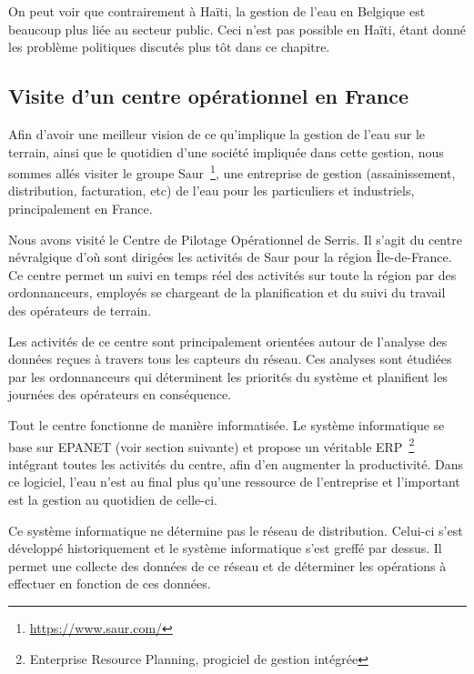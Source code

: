 \documentclass{EPL-master-thesis-covers-FR}
\begin{document}

				On peut voir que contrairement à Haïti, la gestion de l'eau en Belgique est beaucoup plus liée au secteur public. Ceci n'est pas possible en Haïti, étant donné les problème politiques discutés plus tôt dans ce chapitre.

			\subsection*{Visite d'un centre opérationnel en France}

				Afin d'avoir une meilleur vision de ce qu'implique la gestion de l'eau sur le terrain, ainsi que le quotidien d'une société impliquée dans cette gestion, nous sommes allés visiter le groupe Saur~\footnote{\url{https://www.saur.com/}}, une entreprise de gestion (assainissement, distribution, facturation, etc) de l'eau pour les particuliers et industriels, principalement en France.

				Nous avons visité le Centre de Pilotage Opérationnel de Serris. Il s'agit du centre névralgique d'où sont dirigées les activités de Saur pour la région Île-de-France. Ce centre permet un suivi en temps réel des activités sur toute la région par des ordonnanceurs, employés se chargeant de la planification et du suivi du travail des opérateurs de terrain.

				Les activités de ce centre sont principalement orientées autour de l'analyse des données reçues à travers tous les capteurs du réseau. Ces analyses sont étudiées par les ordonnanceurs qui déterminent les priorités du système et planifient les journées des opérateurs en conséquence.

				Tout le centre fonctionne de manière informatisée. Le système informatique se base sur EPANET (voir section suivante) et propose un véritable ERP~\footnote{Enterprise Resource Planning, progiciel de gestion intégrée} intégrant toutes les activités du centre, afin d'en augmenter la productivité. Dans ce logiciel, l'eau n'est au final plus qu'une ressource de l'entreprise et l'important est la gestion au quotidien de celle-ci.

				Ce système informatique ne détermine pas le réseau de distribution. Celui-ci s'est développé historiquement et le système informatique s'est greffé par dessus. Il permet une collecte des données de ce réseau et de déterminer les opérations à effectuer en fonction de ces données.
\end{document}

